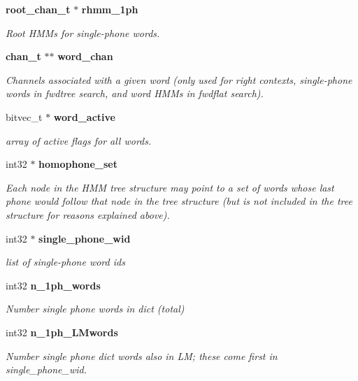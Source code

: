 \begin{DoxyCompactItemize}
\textbf{ root\+\_\+chan\+\_\+t} $\ast$ \textbf{ rhmm\+\_\+1ph}
\begin{DoxyCompactList}\small\item\em Root H\+M\+Ms for single-\/phone words. \end{DoxyCompactList}\item 
\textbf{ chan\+\_\+t} $\ast$$\ast$ \textbf{ word\+\_\+chan}
\begin{DoxyCompactList}\small\item\em Channels associated with a given word (only used for right contexts, single-\/phone words in fwdtree search, and word H\+M\+Ms in fwdflat search). \end{DoxyCompactList}\item 
bitvec\+\_\+t $\ast$ \textbf{ word\+\_\+active}
\begin{DoxyCompactList}\small\item\em array of active flags for all words. \end{DoxyCompactList}\item 
int32 $\ast$ \textbf{ homophone\+\_\+set}
\begin{DoxyCompactList}\small\item\em Each node in the H\+MM tree structure may point to a set of words whose last phone would follow that node in the tree structure (but is not included in the tree structure for reasons explained above). \end{DoxyCompactList}\item 
\mbox{\label{structngram__search__s_a1157923e0060b947e05caa819c8abe2c}} 
int32 $\ast$ \textbf{ single\+\_\+phone\+\_\+wid}
\begin{DoxyCompactList}\small\item\em list of single-\/phone word ids \end{DoxyCompactList}\item 
\mbox{\label{structngram__search__s_a9168184c862d6f63bd7926e6581b25d9}} 
int32 \textbf{ n\+\_\+1ph\+\_\+words}
\begin{DoxyCompactList}\small\item\em Number single phone words in dict (total) \end{DoxyCompactList}\item 
\mbox{\label{structngram__search__s_a988672d895f1ee61dbf790b2065df4df}} 
int32 \textbf{ n\+\_\+1ph\+\_\+\+L\+Mwords}
\begin{DoxyCompactList}\small\item\em Number single phone dict words also in LM; these come first in single\+\_\+phone\+\_\+wid. \end{DoxyCompactList}\item 
$$
\end{DoxyCompactItemize}

